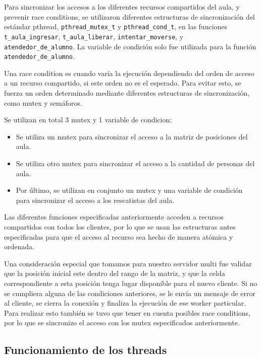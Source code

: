 Para sincronizar los accesos a los diferentes recursos compartidos del aula, y prevenir race conditions, se utilizaron diferentes estructuras de sincronizaci\'on del est\'andar pthread, \verb|pthread_mutex_t| y \verb|pthread_cond_t|, en las funciones \verb|t_aula_ingresar|, \verb|t_aula_liberar|, \verb|intentar_moverse|, y \\\verb|atendedor_de_alumno|. La variable de condici\'on solo fue utilizada para la funci\'on \verb|atendedor_de_alumno|.

Una race condition es cuando var\'ia la ejecuci\'on dependiendo del orden de acceso a un recurso compartido, si este orden no es el esperado. Para evitar esto, se fuerza un orden determinado mediante diferentes estructuras de sincronizaci\'on, como mutex y sem\'aforos.

Se utilizan en total 3 mutex y 1 variable de condicion:

\begin{itemize}
\item Se utiliza un mutex para sincronizar el acceso a la matriz de posiciones del aula.
\item Se utiliza otro mutex para sincronizar el acceso a la cantidad de personas del aula.
\item Por \'ultimo, se utilizan en conjunto un mutex y una variable de condici\'on para sincronizar el acceso a los rescatistas del aula.
\end{itemize}

Las diferentes funciones especificadas anteriormente acceden a recursos compartidos con todos los clientes, por lo que se usan las estructuras antes especificadas para que el acceso al recurso sea hecho de manera at\'omica y ordenada.

Una consideraci\'on especial que tomamos para nuestro servidor multi fue validar que la posici\'on inicial este dentro del rango de la matriz, y que la celda correspondiente a esta posici\'on tenga lugar disponible para el nuevo cliente. Si no se cumpliera alguna de las condiciones anteriores, se le env\'ia un mensaje de error al cliente, se cierra la conexi\'on y finaliza la ejecuci\'on de ese worker particular. Para realizar esto tambi\'en se tuvo que tener en cuenta posibles race conditions, por lo que se sincronizo el acceso con los mutex especificados anteriormente.

\subsection{Funcionamiento de los threads}

